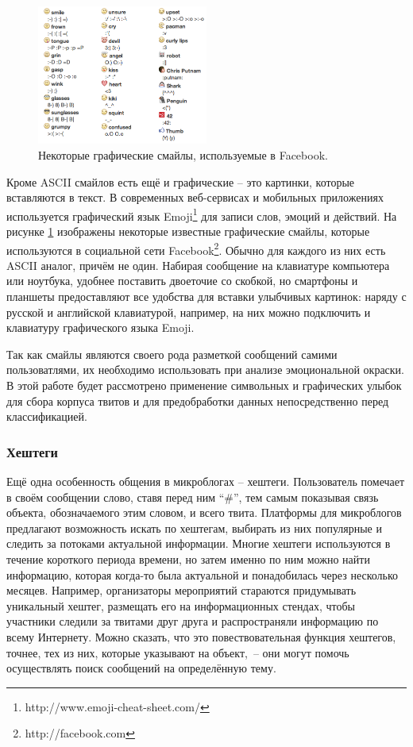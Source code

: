\begin{figure}[h]
\centering
\includegraphics[width=0.5\textwidth]{ListofFacebookChatEmoji}
\caption{Некоторые графические смайлы, используемые в Facebook.}
\label{emoji}
\end{figure}

Кроме ASCII смайлов есть ещё и графические -- это картинки, которые вставляются в текст. В
современных веб-сервисах и мобильных приложениях используется графический язык Emoji\footnote{http://www.emoji-cheat-sheet.com/} для
записи слов, эмоций и действий. На рисунке \ref{emoji} изображены некоторые известные графические
смайлы, которые используются в социальной сети Facebook\footnote{http://facebook.com}. Обычно для
каждого из них есть ASCII аналог, причём не один. Набирая сообщение на клавиатуре компьютера или
ноутбука, удобнее поставить двоеточие со скобкой, но смартфоны и планшеты предоставляют все удобства
для вставки улыбчивых картинок: наряду с русской и английской клавиатурой, например, на них можно
подключить и клавиатуру графического языка Emoji.

Так как смайлы являются своего рода разметкой сообщений самими пользоватлями, их необходимо
использовать при анализе эмоциональной окраски. В этой работе будет рассмотрено применение
символьных и графических улыбок для сбора корпуса твитов и для предобработки данных непосредственно
перед классификацией.

\subsubsection{Хештеги}

Ещё одна особенность общения в микроблогах -- хештеги. Пользователь помечает в своём сообщении
слово, ставя перед ним ``\#'', тем самым показывая связь объекта, обозначаемого этим словом, и всего
твита. Платформы для микроблогов предлагают возможность искать по хештегам, выбирать из них
популярные и следить за потоками актуальной информации. Многие хештеги используются в течение
короткого периода времени, но затем именно по ним можно найти информацию, которая когда-то была
актуальной и понадобилась через несколько месяцев. Например, организаторы мероприятий стараются
придумывать уникальный хештег, размещать его на информационных стендах, чтобы участники следили за
твитами друг друга и распространяли информацию по всему Интернету. Можно сказать, что это
повествовательная функция хештегов, точнее, тех из них, которые указывают на объект,~-- они могут
помочь осуществлять поиск сообщений на определённую тему.

